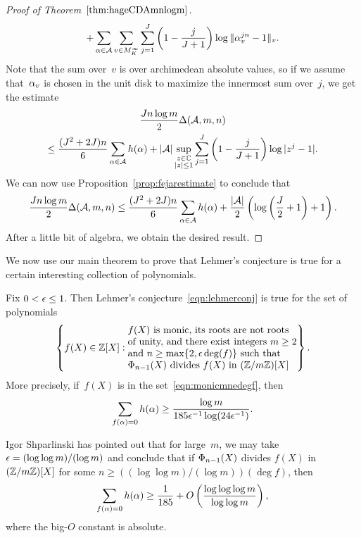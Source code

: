 \documentclass[12pt,reqno]{amsart}
\begin{document}
\begin{proof}[Proof of Theorem~$\ref{thm:hageCDAmnlogm}$]
\begin{multline*}
    +  \sum_{\alpha\in{\mathcal A}}\sum_{v\in M_K^\infty} 
         \sum_{j=1}^J \left(1-\frac{j}{J+1}\right)\log\|\alpha_v^{jn}-1\|_v .
\end{multline*}
Note that the sum over~$v$ is over archimedean absolute values, so if
we assume that~$\alpha_v$ is chosen in the unit disk to maximize the
innermost sum over~$j$, we get the estimate
\begin{multline*}
  \frac{Jn\log m}{2}\Delta({\mathcal A},m,n)  \\*
  \le \frac{(J^2+2J)n}{6}\sum_{\alpha\in{\mathcal A}}h(\alpha) 
    +  |{\mathcal A}| \sup_{\substack{z\in\mathbb{C}\\|z|\le1\\}}
         \sum_{j=1}^J \left(1-\frac{j}{J+1}\right)\log|z^j-1|.
\end{multline*}
We can now use Proposition~\ref{prop:fejarestimate} to conclude
that
\[
  \frac{Jn\log m}{2}\Delta({\mathcal A},m,n) 
  \le \frac{(J^2+2J)n}{6}\sum_{\alpha\in{\mathcal A}}h(\alpha) 
    + \frac{|{\mathcal A}|}{2}\left(\log\left(\frac{J}{2}+1\right)+1\right).
\]
After a little bit of algebra, we obtain the  desired result.
\end{proof}

We now use our main theorem to prove that Lehmer's conjecture
is true for a certain interesting collection of polynomials.

\begin{corollary}
\label{cor:htgeelogm}
Fix $0<\epsilon\le 1$. Then Lehmer's conjecture~\eqref{eqn:lehmerconj} is
true for the set of polynomials
\begin{equation} 
  \label{eqn:monicmnedegf}
  \left\{ f(X)\in \ZZ[X] :
    \begin{tabular}{@{}l@{}}
       $f(X)$ is monic, its roots are not roots\\ 
       of unity, and there exist integers $m\ge2$ \\
       and $n\ge\max\{2,\e\deg(f)\}$ such that\\
       $\F_{n-1}(X)$ divides $f(X)$ in $(\ZZ/m\ZZ)[X]$\\
    \end{tabular}
  \right\}.
\end{equation}
More precisely, if~$f(X)$ is in the set~\eqref{eqn:monicmnedegf}, then
\begin{equation}
  \label{eqn:logm185e}
  \sum_{f(\alpha)=0} h(\alpha) \ge 
   \frac{\log m}{185\epsilon^{-1}\log(24\epsilon^{-1})}.
\end{equation}
\end{corollary}

\begin{remark}
Igor Shparlinski has pointed out that for large~$m$, we may take
$\epsilon=(\log\log m)/(\log m)$ and conclude that if $\Phi_{n-1}(X)$ divides
$f(X)$ in $(\mathbb{Z}/m\mathbb{Z})[X]$ for some
$n\ge((\log\log{m})/(\log{m}))(\deg{f})$, then
\[
  \sum_{f(\alpha)=0} h(\alpha) \ge \frac{1}{185}+
    O\left(\frac{\log\log\log m}{\log\log m}\right),
\]
where the big-$O$ constant is absolute.
\end{remark}
\end{document}
